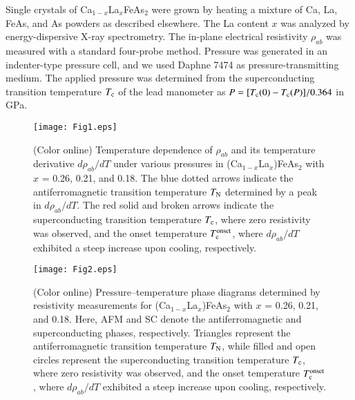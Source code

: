 \documentclass [letter,twocolumn]{jpsj3}
\begin{document}
Single crystals of Ca$_{1-x}$La$_{x}$FeAs$_{2}$ were grown by heating a mixture of Ca, La, FeAs, and As powders as described elsewhere. \cite{K.Kudo_JPSJ_2014-2} 
The La content $x$ was analyzed by energy-dispersive X-ray spectrometry. 
The in-plane electrical resistivity $\rho_{ab}$ was measured with a standard four-probe method.
Pressure was generated in an indenter-type pressure cell, \cite{T.C.Kobayashi_RSI_2007}
and we used Daphne 7474 as pressure-transmitting medium. \cite{K.Murata_RSI_2008}
The applied pressure was determined from the superconducting transition temperature $T_{\rm c}$ of the lead manometer as $P = [T_{\rm c}(0) - T_{\rm c}(P)]/0.364$ in GPa. \cite{A.Eiling_JPFMP_1981,B.Bireckoven_JPESI_1988}

\begin{figure*}[!tb]
\vspace*{0mm}
\begin{center}
\texttt{[image: Fig1.eps]}
\end{center}
\vspace*{00mm}
\caption{
(Color online) Temperature dependence of $\rho_{ab}$ and its temperature derivative $d\rho_{ab}/dT$ under various pressures in (Ca$_{1-x}$La$_{x}$)FeAs$_{2}$ with $x$ = 0.26, 0.21, and 0.18. 
The blue dotted arrows indicate the antiferromagnetic transition temperature $T_{\rm N}$ determined by a peak in $d\rho_{ab}/dT$.
The red solid and broken arrows indicate the superconducting transition temperature $T_{\rm c}$, where zero resistivity was observed, and the onset temperature $T_{\rm c}^{\rm onset}$, where $d\rho_{ab}/dT$ exhibited a steep increase upon cooling, respectively.
}
\label{Fig.1}
\end{figure*}


\begin{figure}[!tb]
\vspace*{0mm}
\begin{center}
\texttt{[image: Fig2.eps]}
\end{center}
\vspace*{00mm}
\caption{
(Color online) Pressure--temperature phase diagrams determined by resistivity measurements for (Ca$_{1-x}$La$_{x}$)FeAs$_{2}$ with $x$ = 0.26, 0.21, and 0.18. 
Here, AFM and SC denote the antiferromagnetic and superconducting phases, respectively. 
Triangles represent the antiferromagnetic transition temperature $T_{\rm N}$, while filled and open circles represent the superconducting transition temperature $T_{\rm c}$, where zero resistivity was observed, and the onset temperature $T_{\rm c}^{\rm onset}$, where $d\rho_{ab}/dT$ exhibited a steep increase upon cooling, respectively.
}
\label{Fig.2}
\end{figure}
\end{document}
